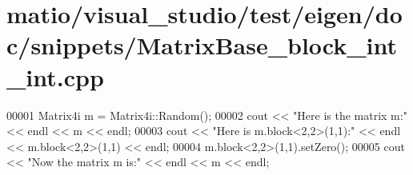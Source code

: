 \hypertarget{matio_2visual__studio_2test_2eigen_2doc_2snippets_2_matrix_base__block__int__int_8cpp_source}{}\section{matio/visual\+\_\+studio/test/eigen/doc/snippets/\+Matrix\+Base\+\_\+block\+\_\+int\+\_\+int.cpp}
\label{matio_2visual__studio_2test_2eigen_2doc_2snippets_2_matrix_base__block__int__int_8cpp_source}

\begin{DoxyCode}
00001 Matrix4i m = Matrix4i::Random();
00002 cout << \textcolor{stringliteral}{"Here is the matrix m:"} << endl << m << endl;
00003 cout << \textcolor{stringliteral}{"Here is m.block<2,2>(1,1):"} << endl << m.block<2,2>(1,1) << endl;
00004 m.block<2,2>(1,1).setZero();
00005 cout << \textcolor{stringliteral}{"Now the matrix m is:"} << endl << m << endl;
\end{DoxyCode}
